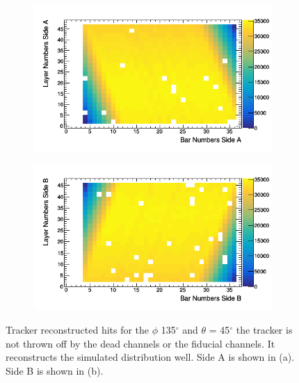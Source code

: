 \begin{figure}[!h]
\centering
\begin{subfigure}{.5\textwidth}
  \centering
  \includegraphics[width=\linewidth]{Chapter5/Figs/cosmicTrackerUncertainties/trackedAWithDead.png}
  \captionsetup{width=.9\linewidth}
  \caption{}
  \label{subFig:trackedAWithDead}
\end{subfigure}%
\begin{subfigure}{.5\textwidth}
  \centering
\includegraphics[width=\linewidth]{Chapter5/Figs/cosmicTrackerUncertainties/trackedBWithDead.png}
  \captionsetup{width=.9\linewidth}
  \caption{}
  \label{subFig:trackedBWithDead}
\end{subfigure}
\caption{Tracker reconstructed hits for the $\phi$ 135$^\circ$ and $\theta$ = 45$^\circ$ the tracker is not thrown off by the dead channels or the fiducial channels. It reconstructs the simulated distribution well. Side A is shown in (a). Side B is shown in (b).}
\label{fig:trackedABWithDead}
\end{figure}

